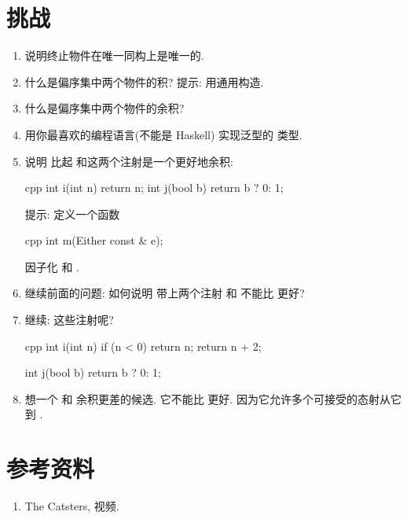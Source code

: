 \section{挑战}

\begin{enumerate}
  \tightlist
  \item
        说明终止物件在唯一同构上是唯一的.
  \item
        什么是偏序集中两个物件的积? 提示: 用通用构造.
  \item
        什么是偏序集中两个物件的余积?
  \item
        用你最喜欢的编程语言(不能是 Haskell) 实现泛型的  类型.
  \item
        说明  比起  和这两个注射是一个更好地余积:

        \begin{snip}{cpp}
int i(int n) { return n; }
int j(bool b) { return b ? 0: 1; }
\end{snip}

        提示: 定义一个函数

        \begin{snip}{cpp}
int m(Either const & e);
\end{snip}

        因子化  和 .
  \item
        继续前面的问题: 如何说明  带上两个注射  和  不能比
         更好?
  \item
        继续: 这些注射呢?

        \begin{snip}{cpp}
int i(int n) {
    if (n < 0) return n;
    return n + 2;
}

int j(bool b) { return b ? 0: 1; }
\end{snip}
  \item
        想一个  和  余积更差的候选. 它不能比  更好.
        因为它允许多个可接受的态射从它到 .
\end{enumerate}

\section{参考资料}

\begin{enumerate}
  \tightlist
  \item
        The Catsters,
         视频.
\end{enumerate}
